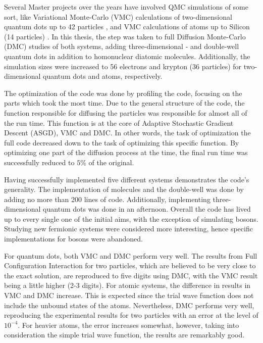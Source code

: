 Several Master projects over the years have involved QMC simulations of some sort, like Variational Monte-Carlo (VMC) calculations of two-dimensional quantum dots up to 42 particles \cite{larseivind}, and VMC calculations of atoms up to Silicon (14 particles) \cite{vmcAtoms}. In this thesis, the step was taken to full Diffusion Monte-Carlo (DMC) studies of both systems, adding three-dimensional - and double-well quantum dots in addition to homonuclear diatomic molecules. Additionally, the simulation sizes were increased to 56 electrons and krypton (36 particles) for two-dimensional quantum dots and atoms, respectively.    

The optimization of the code was done by profiling the code, focusing on the parts which took the most time. Due to the general structure of the code, the function responsible for diffusing the particles was responsible for almost all of the run time. This function is at the core of Adaptive Stochastic Gradient Descent (ASGD), VMC and DMC. In other words, the task of optimization the full code decreased down to the task of optimizing this specific function. By optimizing one part of the diffusion process at the time, the final run time was successfully reduced to $5\%$ of the original.

Having successfully implemented five different systems demonstrates the code's generality. The implementation of molecules and the double-well was done by adding no more than 200 lines of code. Additionally,  implementing three-dimensional quantum dots was done in an afternoon. Overall the code has lived up to every single one of the initial aims, with the exception of simulating bosons. Studying new fermionic systems were considered more interesting, hence specific implementations for bosons were abandoned.  

For quantum dots, both VMC and DMC perform very well. The results from Full Configuration Interaction \cite{Olsen} for two particles, which are believed to be very close to the exact solution, are reproduced to five digits using DMC, with the VMC result being a little higher (2-3 digits). For atomic systems, the difference in results in VMC and DMC increase. This is expected since the trial wave function does not include the unbound states of the atoms. Nevertheless, DMC performs very well, reproducing the experimental results for two particles with an error at the level of $10^{-4}$. For heavier atoms, the error increases somewhat, however, taking into consideration the simple trial wave function, the results are remarkably good.

